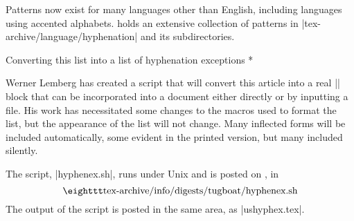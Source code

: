 Patterns now exist for many languages other than English, including
languages using accented alphabets.
{\CTAN} holds an extensive collection of patterns in
|tex-archive/language/hyphenation|
and its subdirectories.

\head * Converting this list into \break a list of hyphenation exceptions *

Werner Lemberg has created a script that will convert this article into
a real |\hyphenation| block that can be incorporated into a document
either directly or by inputting a file.  His work has necessitated
some changes to the macros used to format the list, but the appearance
of the list will not change.  Many inflected forms will be included
automatically, some evident in the printed version, but many included
silently.

The script, |hyphenex.sh|, runs under Unix and is posted on \CTAN, in
$$\hbox{\tt tex-archive/info/digests/tugboat/hyphenex.sh}$$
The output of the script is posted in the same area, as |ushyphex.tex|.



\def\printhyphens#1{%
 \setbox0\vbox{%
  \pretolerance-1\hyphenpenalty-10000%
  \hsize0pt\leftskip0pt\rightskip0pt\parfillskip0pt%
  \hbadness100\hfuzz\maxdimen
  \offinterlineskip
  \interlinepenalty0\clubpenalty0\widowpenalty0\brokenpenalty0%
  \noindent\hskip0pt #1\par
  \setbox0\lastbox \global\setbox1\hbox{\hbox{\unhbox0}}%
  \loop \unskip \setbox0\lastbox \ifhbox0%
   \global\setbox1\hbox{\hbox{\unhbox0}\discretionary{}{}{}\unhbox1}%
  \repeat}%
}

%
%
%
%
%

